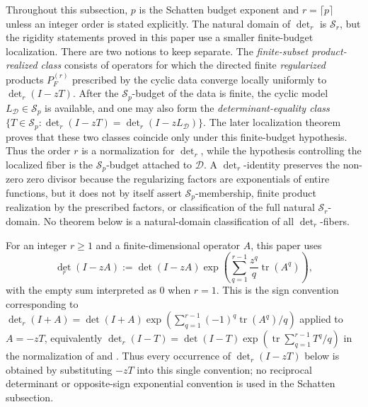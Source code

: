 Throughout this subsection, \(p\) is the Schatten budget exponent and
\(r=\lceil p\rceil\) unless an integer order is stated explicitly.  The natural
domain of \(\det_r\) is \(\mathcal S_r\), but the rigidity statements proved in
this paper use a smaller finite-budget localization.  There are two notions to
keep separate.  The \emph{finite-subset product-realized class} consists of
operators for which the directed finite \emph{regularized} products
\(P_F^{(r)}\) prescribed by the cyclic data converge locally uniformly to
\(\det_r(I-zT)\).  After the
\(\mathcal S_p\)-budget of the data is finite, the cyclic model
\(L_{\mathcal D}\in\mathcal S_p\) is available, and one may also form the
\emph{determinant-equality class}
\(\{T\in\mathcal S_p:\det_r(I-zT)=\det_r(I-zL_{\mathcal D})\}\).
The later localization theorem proves that these two classes coincide only
under this finite-budget hypothesis.  Thus the order \(r\) is a normalization
for \(\det_r\), while the hypothesis controlling the localized fiber is the
\(\mathcal S_p\)-budget attached to \(\mathcal D\).  A \(\det_r\)-identity
preserves the non-zero zero divisor because the regularizing factors are
exponentials of entire functions, but it does not by itself assert
\(\mathcal S_p\)-membership, finite product realization by the prescribed
factors, or classification of the full natural \(\mathcal S_r\)-domain.  No
theorem below is a natural-domain classification of all \(\det_r\)-fibers.

\begin{definition}
  \label{def:regularized-determinant-normalization}
  For an integer \(r\ge1\) and a finite-dimensional operator \(A\), this
  paper uses
  \[
    \det_r(I-zA)
    :=
    \det(I-zA)
    \exp\!\left(\sum_{q=1}^{r-1}\frac{z^q}{q}\operatorname{tr}(A^q)\right),
  \]
  with the empty sum interpreted as \(0\) when \(r=1\). This is the sign
  convention corresponding to
  \(\det_r(I+A)=\det(I+A)\exp(\sum_{q=1}^{r-1}(-1)^q\operatorname{tr}(A^q)/q)\)
  applied to \(A=-zT\), equivalently
  \(\det_r(I-T)=\det(I-T)\exp(\operatorname{tr}\sum_{q=1}^{r-1}T^q/q)\)
  in the normalization of
  \cite[Chapter~9]{Simon2005TraceIdeals} and
  \cite[eq.~(1.3)]{BritzCareyGesztesyNicholsSukochevZanin2021}.  Thus every
  occurrence of \(\det_r(I-zT)\) below is obtained by substituting \(-zT\) into
  this single convention; no reciprocal determinant or opposite-sign
  exponential convention is used in the Schatten subsection.
\end{definition}

